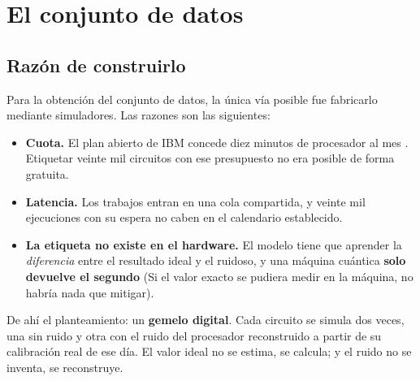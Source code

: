 \section{El conjunto de datos}
\label{sec:dataset}
%
%

\subsection{Razón de construirlo}
\label{sec:gemelo}

Para la obtención del conjunto de datos, la única vía posible fue fabricarlo mediante simuladores. Las razones son las siguientes:

\begin{itemize}
    \item \textbf{Cuota.} El plan abierto de IBM concede diez minutos de procesador al mes
          \cite{ibm2026productos}.
          Etiquetar veinte mil circuitos con ese presupuesto no era posible de forma gratuita.
    \item \textbf{Latencia.} Los trabajos entran en una cola compartida, y veinte mil
          ejecuciones con su espera no caben en el calendario establecido.
    \item \textbf{La etiqueta no existe en el hardware.} El modelo tiene que aprender la \emph{diferencia} entre el resultado ideal y el ruidoso, y una máquina cuántica \textbf{solo devuelve el segundo} (Si el valor exacto se pudiera medir en la máquina, no habría nada que mitigar).
\end{itemize}

De ahí el planteamiento: un \textbf{gemelo digital}. Cada circuito se simula dos veces, una sin
ruido y otra con el ruido del procesador reconstruido a partir de su calibración real de ese
día. El valor ideal no se estima, se calcula; y el ruido no se inventa, se reconstruye.

